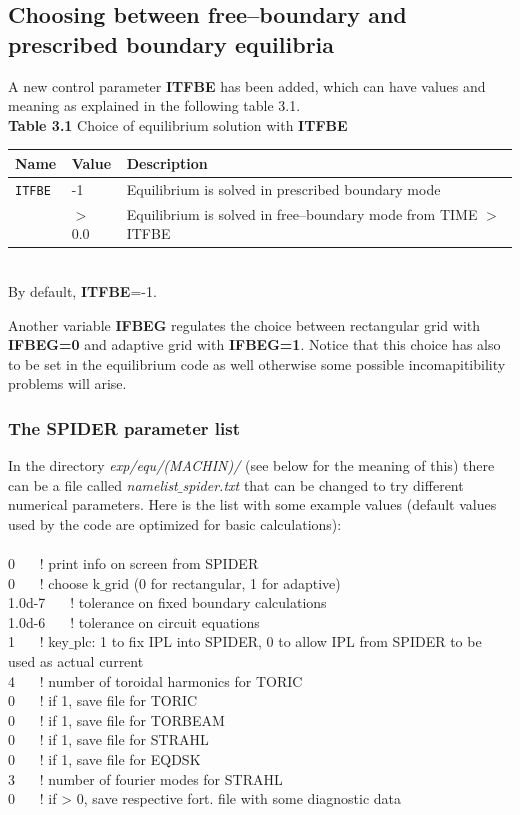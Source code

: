 \subsection{Choosing between free--boundary and prescribed boundary equilibria}
A new control parameter {\bf ITFBE} has been added, which can have values and meaning as explained in the following table 3.1.
\\
{\bf Table 3.1} Choice of equilibrium solution with {\bf ITFBE}\\[2ex]
\begin{tabular}{|l|l|l|}					\hline
\bf Name	&\bf Value & Description\\ \hline
\tt ITFBE 	& -1 & Equilibrium is solved in prescribed boundary mode\\
\tt  	& $>$ 0.0 &  Equilibrium is solved in free--boundary mode from TIME $>$ ITFBE\\ 
\hline
\end{tabular}
\bigskip\\
By default, {\bf ITFBE}=-1.

Another variable {\bf IFBEG} regulates the choice between rectangular grid with {\bf IFBEG=0} and adaptive grid with {\bf IFBEG=1}. Notice that this choice has also to be set in the equilibrium code as well otherwise some possible incomapitibility problems will arise.
%
\subsubsection{The SPIDER parameter list}
In the directory {\it exp/equ/(MACHIN)/} (see below for the meaning of this) there can be a file called {\it 
namelist$\_$spider.txt} that can be changed to try different numerical parameters. Here is the list with some example values 
(default values used by the code are optimized for basic calculations):
\\\\
0 $\:\:\:\:\:$     ! print info on screen from SPIDER\\
0      $\:\:\:\:\:$    ! choose k$\_$grid (0 for rectangular, 1 for adaptive)\\
1.0d-7    $\:\:\:\:\:$      ! tolerance on fixed boundary calculations\\
1.0d-6     $\:\:\:\:\:$      ! tolerance on circuit equations\\
1   $\:\:\:\:\:$         ! key$\_$plc: 1 to fix IPL into SPIDER, 0 to allow IPL from SPIDER to be used as actual current \\
4   $\:\:\:\:\:$          ! number of toroidal harmonics for TORIC\\
0    $\:\:\:\:\:$      ! if 1, save file for TORIC \\
0    $\:\:\:\:\:$      ! if 1, save file for TORBEAM \\
0    $\:\:\:\:\:$     ! if 1, save file for STRAHL \\
0   $\:\:\:\:\:$      ! if 1, save file for EQDSK \\
3    $\:\:\:\:\:$     ! number of fourier modes for STRAHL\\
0   $\:\:\:\:\:$    ! if > 0, save respective fort. file with some diagnostic data\\
%
